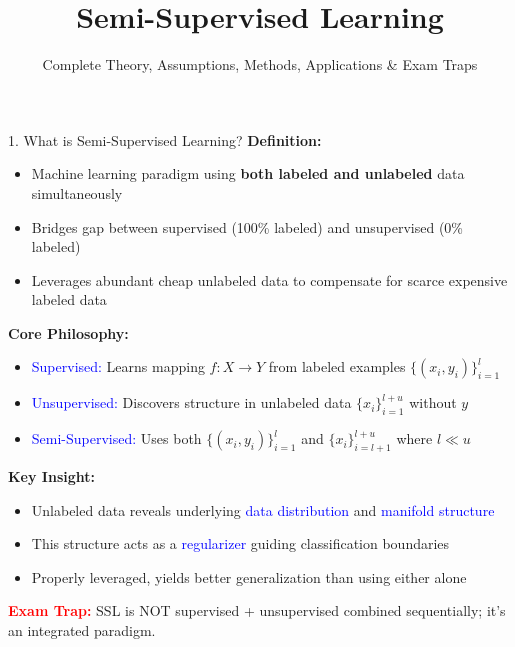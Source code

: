 \documentclass[8pt]{beamer}
\title{Semi-Supervised Learning}
\subtitle{Complete Theory, Assumptions, Methods, Applications \& Exam Traps}
\author{}
\date{}
\begin{document}
	
	\begin{frame}
		\titlepage
	\end{frame}
	
	
	\begin{frame}{1. What is Semi-Supervised Learning?}
		\fontsize{6.5}{7.5}\selectfont
		\textbf{Definition:}
		\begin{itemize}
			\item Machine learning paradigm using \textbf{both labeled and unlabeled} data simultaneously
			\item Bridges gap between supervised (100\% labeled) and unsupervised (0\% labeled)
			\item Leverages abundant cheap unlabeled data to compensate for scarce expensive labeled data
		\end{itemize}
		
		\textbf{Core Philosophy:}
		\begin{itemize}
			\item \textcolor{blue}{Supervised:} Learns mapping $f: X \rightarrow Y$ from labeled examples $\{(x_i, y_i)\}_{i=1}^l$
			\item \textcolor{blue}{Unsupervised:} Discovers structure in unlabeled data $\{x_i\}_{i=1}^{l+u}$ without $y$
			\item \textcolor{blue}{Semi-Supervised:} Uses both $\{(x_i, y_i)\}_{i=1}^l$ and $\{x_i\}_{i=l+1}^{l+u}$ where $l \ll u$
		\end{itemize}
		
		\textbf{Key Insight:}
		\begin{itemize}
			\item Unlabeled data reveals underlying \textcolor{blue}{data distribution} and \textcolor{blue}{manifold structure}
			\item This structure acts as a \textcolor{blue}{regularizer} guiding classification boundaries
			\item Properly leveraged, yields better generalization than using either alone
		\end{itemize}
		
		\textcolor{red}{\textbf{Exam Trap:}} SSL is NOT supervised + unsupervised combined sequentially; it's an integrated paradigm.
	\end{frame}
	
\end{document}
